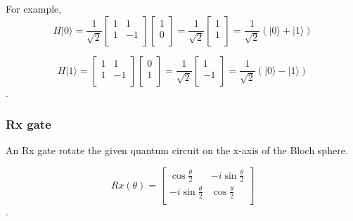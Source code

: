For example,
\begin{equation}
H|0\rangle = \frac{1}{\sqrt{2}}\begin{bmatrix}
1 & 1\\
1 & -1 \\
\end{bmatrix}\left[
\begin{array}{c}
1 \\
0 \\
\end{array}
\right]
= \frac{1}{\sqrt{2}} \left[
\begin{array}{c}
1 \\
1 \\
\end{array}
\right]
= \frac{1}{\sqrt{2}} (|0\rangle + |1\rangle)
\end{equation}

\begin{equation}
H|1\rangle = \begin{bmatrix}
1 & 1\\
1 & -1 \\
\end{bmatrix} 
\left[
\begin{array}{c}
0 \\
1  \\
\end{array}
\right]
= \frac{1}{\sqrt{2}} \left[
\begin{array}{c}
1 \\
-1 \\
\end{array}
\right]
=\frac{1}{\sqrt{2}} (|0\rangle - |1\rangle)
\end{equation}.

\subsubsection{Rx gate}
 An Rx gate rotate the given quantum circuit on the x-axis of the Bloch sphere.
 
 \begin{equation}
  Rx(\theta) = \begin{bmatrix}
\cos{\frac{\theta}{2}} & -i\sin{\frac{\theta}{2}} \\
 -i\sin{\frac{\theta}{2}} & \cos{\frac{\theta}{2}}  \\
\end{bmatrix}
\end{equation}.
 
